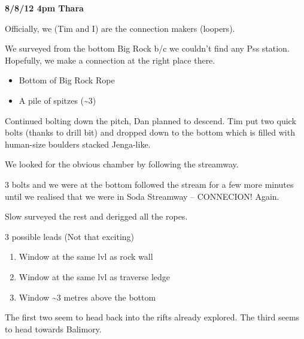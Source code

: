 \textbf{8/8/12 4pm Thara}

Officially, we (Tim and I) are the connection makers (loopers).

We surveyed from the bottom Big Rock b/c we couldn't find any Pss
station. Hopefully, we make a connection at the right place there.

\begin{itemize}
\tightlist
\item
  Bottom of Big Rock Rope
\item
  A pile of spitzes (\textasciitilde 3)
\end{itemize}

Continued bolting down the pitch, Dan planned to descend. Tim put two
quick bolts (thanks to drill bit) and dropped down to the bottom which
is filled with human-size boulders stacked Jenga-like.

We looked for the obvious chamber by following the streamway.

3 bolts and we were at the bottom followed the stream for a few more
minutes until we realised that we were in Soda Streamway -- CONNECION!
Again.

Slow surveyed the rest and derigged all the ropes.

3 possible leads (Not that exciting)

\begin{enumerate}
\def\labelenumi{\arabic{enumi}.}
\tightlist
\item
  Window at the same lvl as rock wall
\item
  Window at the same lvl as traverse ledge
\item
  Window \textasciitilde 3 metres above the bottom
\end{enumerate}

The first two seem to head back into the rifts already explored. The
third seems to head towards Balimory.

